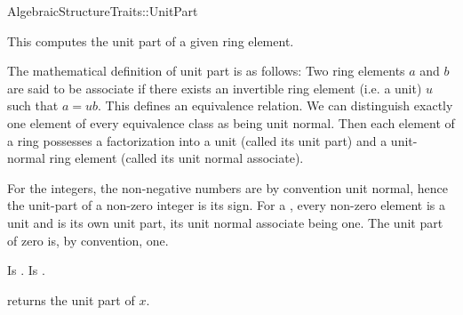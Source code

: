 \begin{ccRefConcept}{AlgebraicStructureTraits::UnitPart}

\ccDefinition

This  computes the unit part of a given ring 
element. 

The mathematical definition of unit part is as follows: Two ring elements $a$ 
and $b$ are said to be associate if there exists an invertible ring element 
(i.e. a unit) $u$ such that $a = ub$. This defines an equivalence relation. 
We can distinguish exactly one element of every equivalence class as being 
unit normal. Then each element of a ring possesses a factorization into a unit 
(called its unit part) and a unit-normal ring element 
(called its unit normal associate).

For the integers, the non-negative numbers are by convention unit normal, 
hence the unit-part of a non-zero integer is its sign. For a , every 
non-zero element is a unit and is its own unit part, its unit normal 
associate being one. The unit part of zero is, by convention, one.

\ccRefines 


\ccTypes
{} 
        { Is .}
        { Is .}

\ccOperations
{}

{ returns the unit part of $x$.}


\ccSeeAlso


\end{ccRefConcept}
